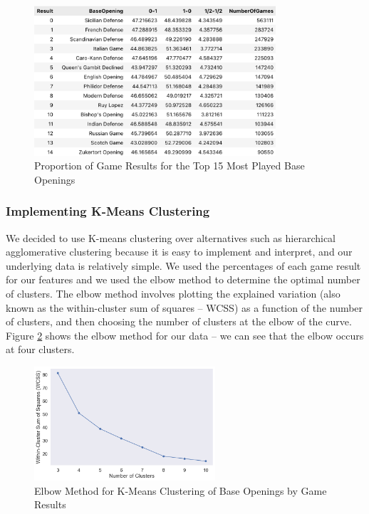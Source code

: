 \documentclass[a4paper, 11pt]{article}
\begin{document}
\begin{figure}[H]
    \centering
    \caption{Proportion of Game Results for the Top 15 Most Played Base Openings}
    \label{fig:proportionOfGameResultsForTop15BaseOpenings}
    \includegraphics[width=0.8\textwidth]{Proportion of Game Results for Top 15 Base Openings.png}
\end{figure}

\subsubsection{Implementing K-Means Clustering}
We decided to use K-means clustering over alternatives such as hierarchical agglomerative clustering because it is easy to implement and interpret, and our underlying data is relatively simple. We used the percentages of each game result for our features and we used the elbow method to determine the optimal number of clusters. The elbow method involves plotting the explained variation (also known as the within-cluster sum of squares -- WCSS) as a function of the number of clusters, and then choosing the number of clusters at the elbow of the curve. Figure \ref{fig:elbowMethodForBaseOpeningsClusteredByGameResults} shows the elbow method for our data -- we can see that the elbow occurs at four clusters.

\begin{figure}[H]
    \centering
    \caption{Elbow Method for K-Means Clustering of Base Openings by Game Results}
    \label{fig:elbowMethodForBaseOpeningsClusteredByGameResults}
    \includegraphics[width=0.6\textwidth]{Elbow Method for Clustering of Base Opening by Results.png}
\end{figure}
\end{document}
